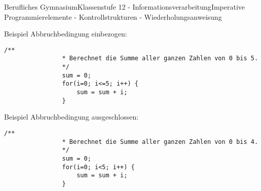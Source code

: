 \documentclass[11pt,oneside,openany,headings=optiontotoc,11pt,numbers=noenddot]{article}
\begin{document}
\begin{worksheet}{Berufliches Gymnasium}{Klassenstufe 12 - Informationsverarbeitung}{Imperative Programmierelemente - Kontrollstrukturen - Wiederholungsanweisung}
\begin{minipage}[t]{0.48\textwidth}
			\vspace*{0pt}
			Beispiel Abbruchbedingung einbezogen:
			\begin{lstlisting}[style=JavaInputStyle,frame=single]
				/**
				* Berechnet die Summe aller ganzen Zahlen von 0 bis 5.
				*/
				sum = 0;
				for(i=0; i<=5; i++) {
					sum = sum + i;
				}
			\end{lstlisting}
		\end{minipage}
		\hfill
		\begin{minipage}[t]{0.48\textwidth}
			\vspace*{0pt}
			Beispiel Abbruchbedingung ausgeschlossen:
			\begin{lstlisting}[style=JavaInputStyle,frame=single]
				/**
				* Berechnet die Summe aller ganzen Zahlen von 0 bis 4.
				*/
				sum = 0;
				for(i=0; i<5; i++) {
					sum = sum + i;
				}
			\end{lstlisting}
		\end{minipage}

\end{worksheet}
\end{document}
